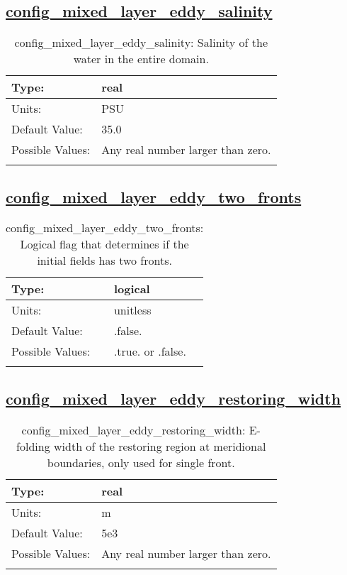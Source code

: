 \subsection[config\_mixed\_layer\_eddy\_salinity]{\hyperref[sec:nm_tab_mixed_layer_eddy]{config\_mixed\_layer\_eddy\_salinity}}
\label{subsec:nm_sec_config_mixed_layer_eddy_salinity}
\begin{center}
\begin{longtable}{| p{2.0in} || p{4.0in} |}
    \hline
    Type: & real \\
    \hline
    Units: & \si{PSU} \\
    \hline
    Default Value: & 35.0 \\
    \hline
    Possible Values: & Any real number larger than zero. \\
    \hline
    \caption{config\_mixed\_layer\_eddy\_salinity: Salinity of the water in the entire domain.}
\end{longtable}
\end{center}
\subsection[config\_mixed\_layer\_eddy\_two\_fronts]{\hyperref[sec:nm_tab_mixed_layer_eddy]{config\_mixed\_layer\_eddy\_two\_fronts}}
\label{subsec:nm_sec_config_mixed_layer_eddy_two_fronts}
\begin{center}
\begin{longtable}{| p{2.0in} || p{4.0in} |}
    \hline
    Type: & logical \\
    \hline
    Units: & \si{unitless} \\
    \hline
    Default Value: & .false. \\
    \hline
    Possible Values: & .true. or .false. \\
    \hline
    \caption{config\_mixed\_layer\_eddy\_two\_fronts: Logical flag that determines if the initial fields has two fronts.}
\end{longtable}
\end{center}
\subsection[config\_mixed\_layer\_eddy\_restoring\_width]{\hyperref[sec:nm_tab_mixed_layer_eddy]{config\_mixed\_layer\_eddy\_restoring\_width}}
\label{subsec:nm_sec_config_mixed_layer_eddy_restoring_width}
\begin{center}
\begin{longtable}{| p{2.0in} || p{4.0in} |}
    \hline
    Type: & real \\
    \hline
    Units: & \si{m} \\
    \hline
    Default Value: & 5e3 \\
    \hline
    Possible Values: & Any real number larger than zero. \\
    \hline
    \caption{config\_mixed\_layer\_eddy\_restoring\_width: E-folding width of the restoring region at meridional boundaries, only used for single front.}
\end{longtable}
\end{center}
